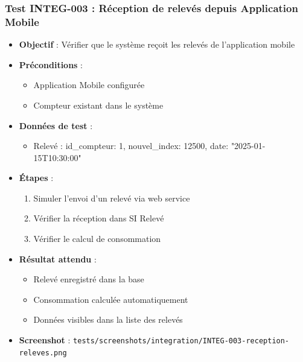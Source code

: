 \subsubsection{Test INTEG-003 : Réception de relevés depuis Application Mobile}
\begin{itemize}
    \item \textbf{Objectif} : Vérifier que le système reçoit les relevés de l'application mobile
    \item \textbf{Préconditions} : 
        \begin{itemize}
            \item Application Mobile configurée
            \item Compteur existant dans le système
        \end{itemize}
    \item \textbf{Données de test} :
        \begin{itemize}
            \item Relevé : {id\_compteur: 1, nouvel\_index: 12500, date: "2025-01-15T10:30:00"}
        \end{itemize}
    \item \textbf{Étapes} :
        \begin{enumerate}
            \item Simuler l'envoi d'un relevé via web service
            \item Vérifier la réception dans SI Relevé
            \item Vérifier le calcul de consommation
        \end{enumerate}
    \item \textbf{Résultat attendu} : 
        \begin{itemize}
            \item Relevé enregistré dans la base
            \item Consommation calculée automatiquement
            \item Données visibles dans la liste des relevés
        \end{itemize}
    \item \textbf{Screenshot} : \texttt{tests/screenshots/integration/INTEG-003-reception-releves.png}
\end{itemize}

